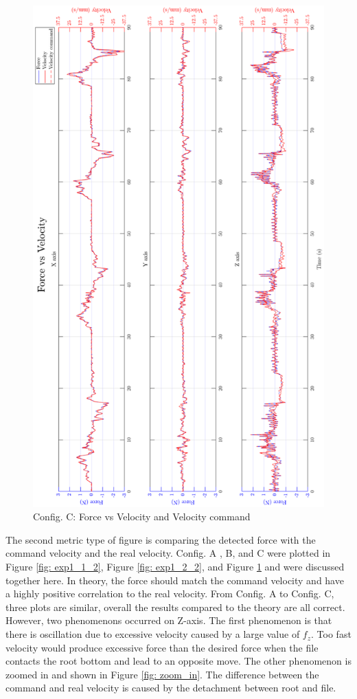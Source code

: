 \begin{figure}[htbp]
\begin{center}
\includegraphics[width=0.9\linewidth]{Images/exp/exp1_3_2.png}
\caption{Config. C: Force vs Velocity and Velocity command}
\label{fig: exp1_3_2}
\end{center}
\end{figure}

\par 
The second metric type of figure is comparing the detected force with the command velocity and the real velocity. Config. A , B, and C were plotted in Figure \ref{fig: exp1_1_2}, Figure \ref{fig: exp1_2_2}, and Figure \ref{fig: exp1_3_2} and were discussed together here. In theory, the force should match the command velocity and have a highly positive correlation to the real velocity. From Config. A to Config. C, three plots are similar, overall the results compared to the theory are all correct. However, two phenomenons occurred on Z-axis. The first phenomenon is that there is oscillation due to excessive velocity caused by a large value of $f_z$. Too fast velocity would produce excessive force than the desired force when the file contacts the root bottom and lead to an opposite move. The other phenomenon is zoomed in and shown in Figure \ref{fig: zoom_in}. The difference between the command and real velocity is caused by the detachment between root and file.

